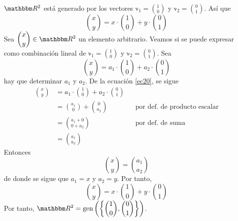 \begin{example}
    $\RR[2]$ está generado por los vectores $\displaystyle \mathbb{v}_1 = \binom{1}{0}$ y $\displaystyle \mathbb{v}_2 = \binom{0}{1}$. Así que
    $$\binom{x}{y} = x \cdot \binom{1}{0} + y \cdot \binom{0}{1}$$
    \solucion Sea $\displaystyle \binom{x}{y} \in \RR[2]$ un elemento arbitrario. Veamos si se puede expresar como combinación lineal de $\displaystyle \mathbb{v}_1 = \binom{1}{0}$ y $\displaystyle \mathbb{v}_2 = \binom{0}{1}$. Sea
    \begin{equation}
        \binom{x}{y} = a_1 \cdot \binom{1}{0} + a_2 \cdot \binom{0}{1} \label{ec20}
    \end{equation}
    hay que determinar $a_1$ y $a_2$. De la ecuación \eqref{ec20}, se sigue
    \begin{align*}
        \binom{x}{y} & = a_1 \cdot \binom{1}{0} + a_2 \cdot \binom{0}{1} \\
        & = \binom{a_1}{0} + \binom{0}{a_2} && \text{por def. de producto escalar} \\
        & = \binom{a_1+0}{0+a_2} && \text{por def. de suma} \\
        & = \binom{a_1}{a_2}
    \end{align*}
    Entonces
    $$\binom{x}{y} = \binom{a_1}{a_2}$$
    de donde se sigue que $a_1 = x$ y $a_2 = y$. Por tanto,
    $$\binom{x}{y} = x \cdot \binom{1}{0} + y \cdot \binom{0}{1}$$
    Por tanto, $\displaystyle \RR[2] = \Gen \left( \left\{ \binom{1}{0},  \binom{0}{1} \right \} \right)$.
\end{example}

